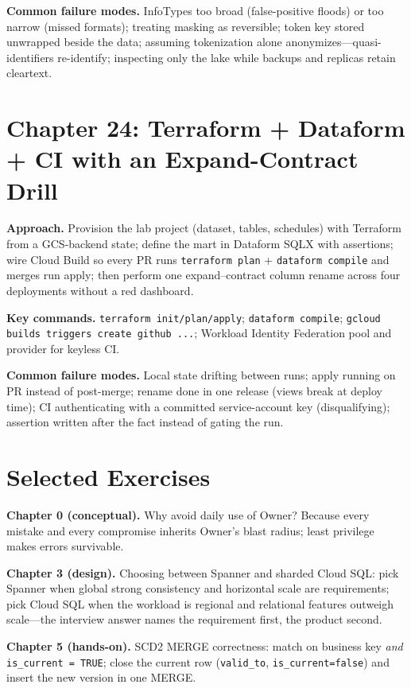 \textbf{Common failure modes.} InfoTypes too broad (false-positive floods) or too narrow (missed
formats); treating masking as reversible; token key stored unwrapped beside the data; assuming
tokenization alone anonymizes---quasi-identifiers re-identify; inspecting only the lake while
backups and replicas retain cleartext.

\section{Chapter 24: Terraform + Dataform + CI with an Expand-Contract Drill}
\textbf{Approach.} Provision the lab project (dataset, tables, schedules) with Terraform from a
GCS-backend state; define the mart in Dataform SQLX with assertions; wire Cloud Build so every PR
runs \texttt{terraform plan} + \texttt{dataform compile} and merges run apply; then perform one
expand--contract column rename across four deployments without a red dashboard.

\textbf{Key commands.} \texttt{terraform init/plan/apply}; \texttt{dataform compile};
\texttt{gcloud builds triggers create github ...}; Workload Identity Federation pool and provider
for keyless CI.

\textbf{Common failure modes.} Local state drifting between runs; apply running on PR instead of
post-merge; rename done in one release (views break at deploy time); CI authenticating with a
committed service-account key (disqualifying); assertion written after the fact instead of gating
the run.

\section{Selected Exercises}
%
\textbf{Chapter 0 (conceptual).} Why avoid daily use of Owner? Because every mistake and every
compromise inherits Owner's blast radius; least privilege makes errors survivable.

\textbf{Chapter 3 (design).} Choosing between Spanner and sharded Cloud SQL: pick Spanner when
global strong consistency and horizontal scale are requirements; pick Cloud SQL when the workload
is regional and relational features outweigh scale---the interview answer names the requirement
first, the product second.

\textbf{Chapter 5 (hands-on).} SCD2 MERGE correctness: match on business key \emph{and}
\texttt{is\_current = TRUE}; close the current row (\texttt{valid\_to}, \texttt{is\_current=false})
and insert the new version in one MERGE.

